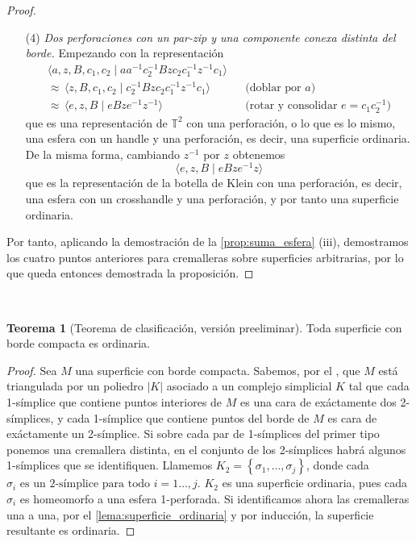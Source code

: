 \documentclass[10pt]{report}
\newcommand{\Toro}{\mathbb{T}^2}
\theoremstyle{definition}
\newtheorem{tma}[defin]{Teorema}
\begin{document}
\begin{proof}
\begin{itemize}
\item[(4)] \textit{Dos perforaciones con un par-zip y una componente conexa distinta del borde.} Empezando con la representación
\begin{align*}
\langle a,z,B,c_1,c_2\mid aa^{-1} c_2^{-1}Bzc_2c_1^{-1}z^{-1}c_1\rangle & & \\
\approx  \, \langle z,B,c_1,c_2\mid c_2^{-1}Bzc_2c_1^{-1}z^{-1}c_1\rangle &&\text{(doblar por } a\text{)}\\
\approx  \, \langle e,z,B\mid eBze^{-1}z^{-1}\rangle &&\text{(rotar y consolidar } e=c_1c_2^{-1} \text{)}
\end{align*}
que es una representación de $\Toro$ con una perforación, o lo que es lo mismo, una esfera con un handle y una perforación, es decir, una superficie ordinaria. De la misma forma, cambiando $z^{-1}$ por $z$ obtenemos
\[
\langle e,z,B\mid eBze^{-1}z\rangle
\]
que es la representación de la botella de Klein con una perforación, es decir, una esfera con un crosshandle y una perforación, y por tanto una superficie ordinaria.
\end{itemize}
Por tanto, aplicando la demostración de la \autoref{prop:suma_esfera} (iii), demostramos los cuatro puntos anteriores para cremalleras sobre superficies arbitrarias, por lo que queda entonces demostrada la proposición.

\end{proof}

\

\begin{tma}[Teorema de clasificación, versión preeliminar] %
Toda superficie con borde compacta es ordinaria.
\end{tma}
\begin{proof}
Sea $M$ una superficie con borde compacta. Sabemos, por el , que $M$ está triangulada por un poliedro $|K|$ asociado a un complejo simplicial $K$ tal que cada 1-símplice que contiene puntos interiores de $M$ es una cara de exáctamente dos 2-símplices, y cada 1-símplice que contiene puntos del borde de $M$ es cara de exáctamente un 2-símplice. Si sobre cada par de 1-símplices del primer tipo ponemos una cremallera distinta, en el conjunto de los 2-símplices habrá algunos 1-símplices que se identifiquen. Llamemos $K_2=\left\{\sigma_1,\dots ,\sigma_j\right\}$, donde cada $\sigma_i \text{ es un 2-símplice para todo } i=1\dots ,j$. $K_2$ es una superficie ordinaria, pues cada $\sigma_i$ es homeomorfo a una esfera 1-perforada. Si identificamos ahora las cremalleras una a una, por el \autoref{lema:superficie_ordinaria} y por inducción, la superficie resultante es ordinaria.
\end{proof}
\end{document}
